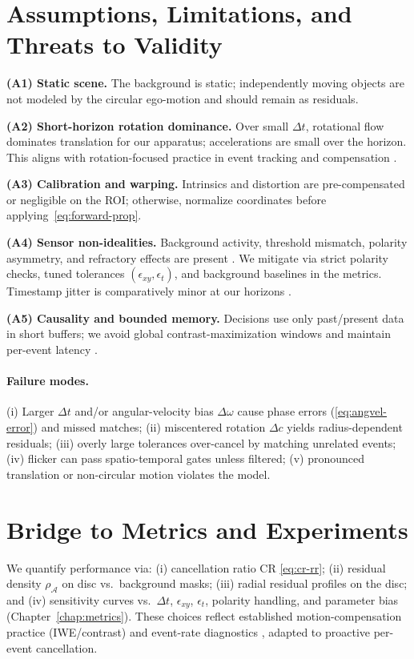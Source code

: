 \section{Assumptions, Limitations, and Threats to Validity}
\label{sec:assumptions}
\textbf{(A1) Static scene.} The background is static; independently moving objects are not modeled by the circular ego-motion and should remain as residuals.

\textbf{(A2) Short-horizon rotation dominance.} Over small $\Delta t$, rotational flow dominates translation for our apparatus; accelerations are small over the horizon. This aligns with rotation-focused practice in event tracking and compensation \cite{Gallego2017Angular,Gallego2018CMax}.

\textbf{(A3) Calibration and warping.} Intrinsics and distortion are pre-compensated or negligible on the ROI; otherwise, normalize coordinates before applying~\eqref{eq:forward-prop}.

\textbf{(A4) Sensor non-idealities.} Background activity, threshold mismatch, polarity asymmetry, and refractory effects are present \cite{Brandli2014,Delbruck2020,Gallego2020Survey}. We mitigate via strict polarity checks, tuned tolerances $(\epsilon_{xy},\epsilon_t)$, and background baselines in the metrics. Timestamp jitter is comparatively minor at our horizons \cite{Wang2025Thesis}.

\textbf{(A5) Causality and bounded memory.} Decisions use only past/present data in short buffers; we avoid global contrast-maximization windows and maintain per-event latency \cite{Bardow2016SOFIE,Gallego2018CMax}.

\paragraph{Failure modes.}
(i) Larger $\Delta t$ and/or angular-velocity bias $\Delta\omega$ cause phase errors (\ref{eq:angvel-error}) and missed matches; (ii) miscentered rotation $\Delta c$ yields radius-dependent residuals; (iii) overly large tolerances over-cancel by matching unrelated events; (iv) flicker can pass spatio-temporal gates unless filtered; (v) pronounced translation or non-circular motion violates the model.

\section{Bridge to Metrics and Experiments}
\label{sec:metrics-bridge}
We quantify performance via: (i) cancellation ratio $\mathrm{CR}$ \eqref{eq:cr-rr}; (ii) residual density $\rho_\mathcal{A}$ on disc vs.\ background masks; (iii) radial residual profiles on the disc; and (iv) sensitivity curves vs.\ $\Delta t$, $\epsilon_{xy}$, $\epsilon_t$, polarity handling, and parameter bias (Chapter~\ref{chap:metrics}). These choices reflect established motion-compensation practice (IWE/contrast) and event-rate diagnostics \cite{Bardow2016SOFIE,Gallego2018CMax,Stoffregen2019Segmentation,Gallego2020Survey}, adapted to proactive per-event cancellation.
